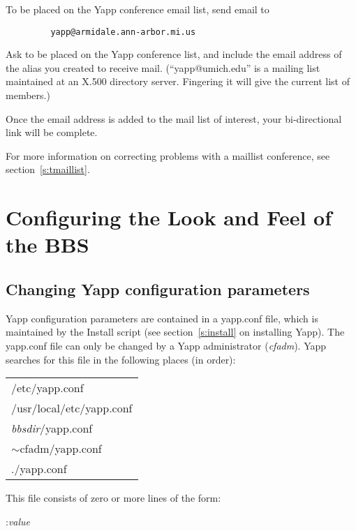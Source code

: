 \documentclass[twoside]{report}
\begin{document}
      To be placed on the Yapp conference email list, send email to 
         \begin{verbatim} 
         yapp@armidale.ann-arbor.mi.us
         \end{verbatim}
   
      Ask to be placed on the Yapp conference list, and include the email 
      address of the alias you created to receive mail.  
      (``yapp@umich.edu'' is a mailing list maintained at an X.500 
      directory server.  Fingering it will give the current list of members.)  
   
      Once the email address is added to the mail list of interest, your 
      bi-directional link will be complete.
   
      For more information on correcting problems with a maillist conference, 
      see section~\ref{s:tmaillist}.

\chapter{Configuring the Look and Feel of the BBS} \label {c:configur}
   
  \section{Changing Yapp configuration parameters} \label{s:yapp.conf} 
      Yapp configuration parameters are 
      contained in a yapp.conf file, which is maintained 
      by the Install script (see section~\ref{s:install} on 
      installing Yapp).  The yapp.conf file can only be changed by a Yapp 
      administrator ({\em cfadm}). Yapp searches for this file in the 
      following places (in order):

      \begin{tabular}{l}
       /etc/yapp.conf \\
       /usr/local/etc/yapp.conf \\
       {\em bbsdir}/yapp.conf \\
       $\sim$cfadm/yapp.conf \\
       ./yapp.conf \\
      \end{tabular}
   
      This file consists of zero or more lines of the form:

         {:{\em value}\\}
\end{document}
